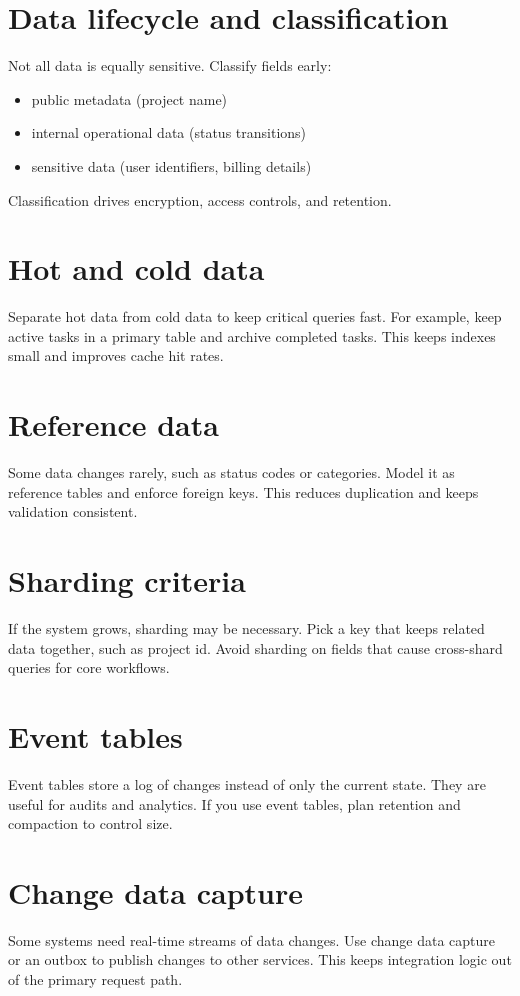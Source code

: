 \section{Data lifecycle and classification}
Not all data is equally sensitive.
Classify fields early:
\begin{itemize}[nosep]
  \item public metadata (project name)
  \item internal operational data (status transitions)
  \item sensitive data (user identifiers, billing details)
\end{itemize}

Classification drives encryption, access controls, and retention.

\section{Hot and cold data}
Separate hot data from cold data to keep critical queries fast.
For example, keep active tasks in a primary table and archive completed tasks.
This keeps indexes small and improves cache hit rates.

\section{Reference data}
Some data changes rarely, such as status codes or categories.
Model it as reference tables and enforce foreign keys.
This reduces duplication and keeps validation consistent.

\section{Sharding criteria}
If the system grows, sharding may be necessary.
Pick a key that keeps related data together, such as project id.
Avoid sharding on fields that cause cross-shard queries for core workflows.

\section{Event tables}
Event tables store a log of changes instead of only the current state.
They are useful for audits and analytics.
If you use event tables, plan retention and compaction to control size.

\section{Change data capture}
Some systems need real-time streams of data changes.
Use change data capture or an outbox to publish changes to other services.
This keeps integration logic out of the primary request path.

